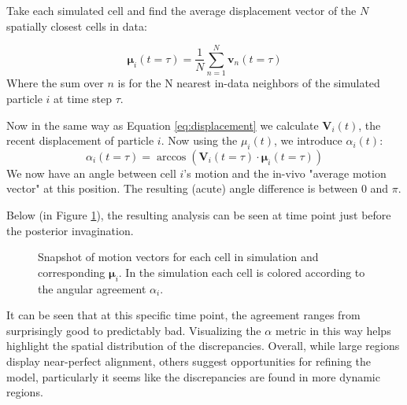 Take each simulated cell and find the average displacement vector of the $N$ spatially closest cells in data:

\begin{equation}
    \boldsymbol{\mu}_i(t=\tau) = \frac{1}{N} \sum_{n=1}^{N}\boldsymbol{v}_n(t=\tau)
\end{equation}
Where the sum over $n$ is for the N nearest in-data neighbors of the simulated particle $i$ at time step $\tau$.

Now in the same way as Equation \ref{eq:displacement} we calculate $\boldsymbol{V}_i(t)$, the recent displacement of particle $i$. Now using the $\mu_i(t)$, we introduce $\alpha_i(t)$:
\begin{equation}
    \alpha_i(t=\tau) = \arccos\left(\boldsymbol{V}_i(t=\tau)\cdot\boldsymbol{\mu}_i(t=\tau)\right)
\end{equation}
We now have an angle between cell $i$'s motion and the in-vivo "average motion vector" at this position.
The resulting (acute) angle difference is between 0 and $\pi$. 

Below (in Figure  \ref{fig:motionAgreementExample}), the resulting analysis can be seen at time point just before the posterior invagination. 

\begin{figure}[H]
    \centering
    \caption{Snapshot of motion vectors for each cell in simulation and corresponding $\boldsymbol{\mu}_i$. In the simulation each cell is colored according to the angular agreement $\alpha_i$.}
    \label{fig:motionAgreementExample}
\end{figure}


It can be seen that at this specific time point, the agreement ranges from surprisingly good to predictably bad. Visualizing the $\alpha$ metric in this way helps highlight the spatial distribution of the discrepancies. Overall, while large regions display near-perfect alignment, others suggest opportunities for refining the model, particularly it seems like the discrepancies are found in more dynamic regions.\\

